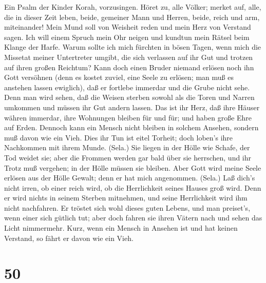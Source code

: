  Ein Psalm der Kinder Korah, vorzusingen. Höret zu, alle
Völker; merket auf, alle, die in dieser Zeit leben,  beide,
gemeiner Mann und Herren, beide, reich und arm, miteinander!
 Mein Mund soll von Weisheit reden und mein Herz von
Verstand sagen.  Ich will einem Spruch mein Ohr neigen und
kundtun mein Rätsel beim Klange der Harfe.  Warum sollte ich
mich fürchten in bösen Tagen, wenn mich die Missetat meiner Untertreter
umgibt,  die sich verlassen auf ihr Gut und trotzen auf
ihren großen Reichtum?  Kann doch einen Bruder niemand
erlösen noch ihn Gott versöhnen  (denn es kostet zuviel,
eine Seele zu erlösen; man muß es anstehen lassen ewiglich),
 daß er fortlebe immerdar und die Grube nicht sehe.
 Denn man wird sehen, daß die Weisen sterben sowohl als die
Toren und Narren umkommen und müssen ihr Gut andern lassen.
 Das ist ihr Herz, daß ihre Häuser währen immerdar, ihre
Wohnungen bleiben für und für; und haben große Ehre auf Erden.
 Dennoch kann ein Mensch nicht bleiben in solchem Ansehen,
sondern muß davon wie ein Vieh.  Dies ihr Tun ist eitel
Torheit; doch loben's ihre Nachkommen mit ihrem Munde. (Sela.)
 Sie liegen in der Hölle wie Schafe, der Tod weidet sie;
aber die Frommen werden gar bald über sie herrschen, und ihr Trotz muß
vergehen; in der Hölle müssen sie bleiben.  Aber Gott wird
meine Seele erlösen aus der Hölle Gewalt; denn er hat mich angenommen.
(Sela.)  Laß dich's nicht irren, ob einer reich wird, ob
die Herrlichkeit seines Hauses groß wird.  Denn er wird
nichts in seinem Sterben mitnehmen, und seine Herrlichkeit wird ihm
nicht nachfahren.  Er tröstet sich wohl dieses guten
Lebens, und man preiset's, wenn einer sich gütlich tut; 
aber doch fahren sie ihren Vätern nach und sehen das Licht nimmermehr.
 Kurz, wenn ein Mensch in Ansehen ist und hat keinen
Verstand, so fährt er davon wie ein Vieh.

\hypertarget{section-49}{%
\section{50}\label{section-49}}

